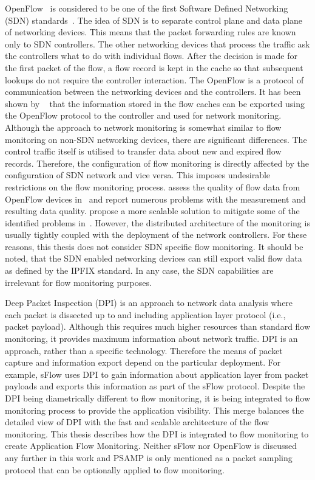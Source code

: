 OpenFlow~\cite{ONF-2012-OpenFlow} is considered to be one of the first Software Defined Networking (SDN) standards~\cite{Singh-2017-Survey, Hu-2014-Survey}. The idea of SDN is to separate control plane and data plane of networking devices. This means that the packet forwarding rules are known only to SDN controllers. The other networking devices that process the traffic ask the controllers what to do with individual flows. After the decision is made for the first packet of the flow, a flow record is kept in the cache so that subsequent lookups do not require the controller interaction. The OpenFlow is a protocol of communication between the networking devices and the controllers. It has been shown by \citeauthor{Yu-2013-FlowSense}~\cite{Yu-2013-FlowSense} that the information stored in the flow caches can be exported using the OpenFlow protocol to the controller and used for network monitoring. Although the approach to network monitoring is somewhat similar to flow monitoring on non-SDN networking devices, there are significant differences. The control traffic itself is utilised to transfer data about new and expired flow records. Therefore, the configuration of flow monitoring is directly affected by the configuration of SDN network and vice versa. This imposes undesirable restrictions on the flow monitoring process. \citeauthor{Hendriks-2016-Assessing} assess the quality of flow data from OpenFlow devices in~\cite{Hendriks-2016-Assessing} and report numerous problems with the measurement and resulting data quality. \citeauthor{Suarez-Varela-2017-Towards} propose a more scalable solution to mitigate some of the identified problems in~\cite{Suarez-Varela-2017-Towards}. However, the distributed architecture of the monitoring is usually tightly coupled with the deployment of the network controllers. For these reasons, this thesis does not consider SDN specific flow monitoring. It should be noted, that the SDN enabled networking devices can still export valid flow data as defined by the IPFIX standard. In any case, the SDN capabilities are irrelevant for flow monitoring purposes.

Deep Packet Inspection (DPI) is an approach to network data analysis where each packet is dissected up to and including application layer protocol (i.e., packet payload). Although this requires much higher resources than standard flow monitoring, it provides maximum information about network traffic. DPI is an approach, rather than a specific technology. Therefore the means of packet capture and information export depend on the particular deployment. For example, sFlow uses DPI to gain information about application layer from packet payloads and exports this information as part of the sFlow protocol. Despite the DPI being diametrically different to flow monitoring, it is being integrated to flow monitoring process to provide the application visibility. This merge balances the detailed view of DPI with the fast and scalable architecture of the flow monitoring. This thesis describes how the DPI is integrated to flow monitoring to create Application Flow Monitoring. Neither sFlow nor OpenFlow is discussed any further in this work and PSAMP is only mentioned as a packet sampling protocol that can be optionally applied to flow monitoring.



